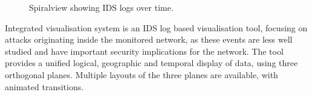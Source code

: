 \begin{figure}[tbh]
\caption{\protect\label{spiral}Spiralview showing IDS logs over time. \cite{bertini2007spiralview}}
\end{figure}

Integrated visualisation system \cite{mukosaka2007integrated} is an IDS log based visualisation tool, focusing on attacks originating inside the monitored network, as these events are less well studied and have important security implications for the network. The tool provides a unified logical, geographic and temporal display of data, using three orthogonal planes. Multiple layouts of the three planes are available, with animated transitions. 

